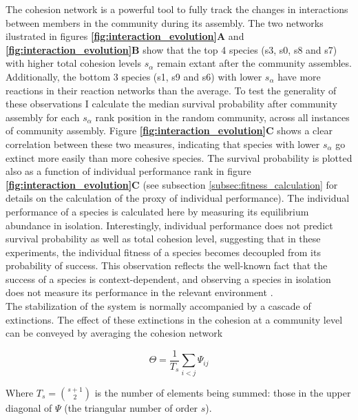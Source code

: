 \documentclass[titlepage,11pt]{article}
\begin{document}
\begin{linenumbers}
\begin{singlespace}
The cohesion network is a powerful tool to fully track the changes in interactions between members in the community during its assembly. The two networks ilustrated in figures \textbf{\ref{fig:interaction_evolution}A} and \textbf{\ref{fig:interaction_evolution}B} show that the top 4 species (s3, s0, s8 and s7) with higher total cohesion levels $ s_{\alpha} $ remain extant after the community assembles. Additionally, the bottom 3 species (s1, s9 and s6) with lower $ s_{\alpha} $ have more reactions in their reaction networks than the average. To test the generality of these observations I calculate the median survival probability after community assembly for each $ s_{\alpha} $ rank position in the random community, across all instances of community assembly. Figure \textbf{\ref{fig:interaction_evolution}C} shows a clear correlation between these two measures, indicating that species with lower $ s_{\alpha} $ go extinct more easily than more cohesive species. The survival probability is plotted also as a function of individual performance rank in figure \textbf{\ref{fig:interaction_evolution}C} (see subsection \ref{subsec:fitness_calculation} for details on the calculation of the proxy of individual performance). The individual performance of a species is calculated here by measuring its equilibrium abundance in isolation. Interestingly, individual performance does not predict survival probability as well as total cohesion level, suggesting that in these experiments, the individual fitness of a species becomes decoupled from its probability of success. This observation reflects the well-known fact that the success of a species is context-dependent, and observing a species in isolation does not measure its performance in the relevant environment \citep{McGill2006, Mcintire2014}.\\ %
The stabilization of the system is normally accompanied by a cascade of extinctions. The effect of these extinctions in the cohesion at a community level can be conveyed by averaging the cohesion network 
\begin{linenomath*}
	\begin{equation}
		\Theta = \frac{1}{T_s}\sum_{i < j}\Psi_{ij}
	\end{equation}
\end{linenomath*}
Where $T_s = {s+1 \choose 2} $ is the number of elements being summed: those in the upper diagonal of $ \Psi $ (the triangular number of order $ s $).\\

\end{singlespace}
\end{linenumbers}
\end{document}
